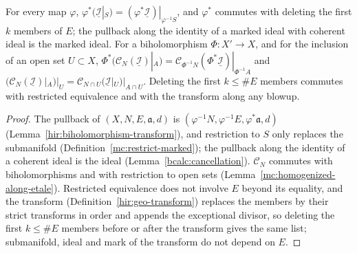 \begin{lemma}
\label{mc:restriction-operations-along}
\leanok
For every map \(\varphi\), \(\varphi^*(\underline{\mathcal I}|_S)=(\varphi^*\underline{\mathcal I})|_{\varphi^{-1}S}\), and \(\varphi^*\) commutes with deleting the first \(k\) members of \(E\);
the pullback along the identity of a marked ideal with coherent ideal is the marked ideal. For a biholomorphism \(\Phi\colon X'\to X\), and for the inclusion of an
open set \(U\subset X\), \(\Phi^*(\mathcal C_N(\underline{\mathcal I})|_A)=\mathcal C_{\Phi^{-1}N}(\Phi^*\underline{\mathcal I})|_{\Phi^{-1}A}\) and
\((\mathcal C_N(\underline{\mathcal I})|_A)|_U=\mathcal C_{N\cap U}(\underline{\mathcal I}|_U)|_{A\cap U}\). Deleting the first \(k\le\#E\) members commutes with restricted
equivalence and with the transform along any blowup.
\end{lemma}
\begin{proof}
\leanok
The pullback of \((X,N,E,\mathfrak a,d)\) is \((\varphi^{-1}N,\varphi^{-1}E,\varphi^*\mathfrak a,d)\) (Lemma~\ref{hir:biholomorphism-transform}), and restriction to \(S\) only replaces the
submanifold (Definition~\ref{mc:restrict-marked}); the pullback along the identity of a coherent ideal is the ideal (Lemma~\ref{bcalc:cancellation}). \(\mathcal C_N\) commutes
with biholomorphisms and with restriction to open sets (Lemma~\ref{mc:homogenized-along-etale}). Restricted equivalence does not involve \(E\) beyond its equality, and the
transform (Definition~\ref{hir:geo-transform}) replaces the members by their strict transforms in order and appends the exceptional divisor, so deleting the first
\(k\le\#E\) members before or after the transform gives the same list; submanifold, ideal and mark of the transform do not depend on \(E\).
\end{proof}

